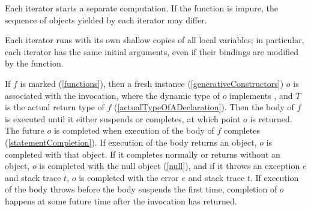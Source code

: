 \documentclass[makeidx]{article}
\begin{document}
{\LMHash{}%
Each iterator starts a separate computation.
If the \code{\SYNC*} function is impure, the sequence of objects yielded by each iterator may differ.


\LMHash{}%
Each iterator runs with its own shallow copies of all local variables; in particular, each iterator has the same initial arguments, even if their bindings are modified by the function.

\LMHash{}%
If $f$ is marked \ASYNC{} (\ref{functions}),
then a fresh instance (\ref{generativeConstructors}) $o$ is associated with the invocation,
where the dynamic type of $o$ implements ,
and $T$ is the actual return type of $f$ (\ref{actualTypeOfADeclaration}).
Then the body of $f$ is executed until it either suspends or completes, at which point $o$ is returned.
The future $o$ is completed when execution of the body of $f$ completes (\ref{statementCompletion}).
If execution of the body returns an object, $o$ is completed with that object.
If it completes normally or returns without an object,
$o$ is completed with the null object (\ref{null}),
and if it throws an exception $e$ and stack trace $t$,
$o$ is completed with the error $e$ and stack trace $t$.
If execution of the body throws before the body suspends the first time,
completion of $o$ happens at some future time after the invocation has returned.

}
\end{document}
